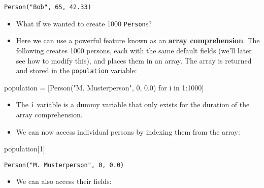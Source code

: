 \documentclass[
  letterpaper,
  DIV=11,
  numbers=noendperiod]{scrartcl}
\newenvironment{Shaded}{\begin{snugshade}}{\end{snugshade}}
\newcommand{\FloatTok}[1]{\textcolor[rgb]{0.68,0.00,0.00}{#1}}
\newcommand{\FunctionTok}[1]{\textcolor[rgb]{0.28,0.35,0.67}{#1}}
\newcommand{\KeywordTok}[1]{\textcolor[rgb]{0.00,0.23,0.31}{#1}}
\newcommand{\NormalTok}[1]{\textcolor[rgb]{0.00,0.23,0.31}{#1}}
\newcommand{\OperatorTok}[1]{\textcolor[rgb]{0.37,0.37,0.37}{#1}}
\newcommand{\StringTok}[1]{\textcolor[rgb]{0.13,0.47,0.30}{#1}}
\providecommand{\tightlist}{%
  \setlength{\itemsep}{0pt}\setlength{\parskip}{0pt}}\usepackage{longtable,booktabs,array}
\begin{document}
\begin{verbatim}
Person("Bob", 65, 42.33)
\end{verbatim}

\begin{itemize}
\tightlist
\item
  What if we wanted to create 1000 \texttt{Person}s?
\end{itemize}

\begin{itemize}
\tightlist
\item
  Here we can use a powerful feature known as an \textbf{array
  comprehension}. The following creates 1000 persons, each with the same
  default fields (we'll later see how to modify this), and places them
  in an array. The array is returned and stored in the
  \texttt{population} variable:
\end{itemize}

\begin{Shaded}
\begin{Highlighting}[]
\NormalTok{population }\OperatorTok{=}\NormalTok{ [}\FunctionTok{Person}\NormalTok{(}\StringTok{"M. Musterperson"}\NormalTok{, }\FloatTok{0}\NormalTok{, }\FloatTok{0.0}\NormalTok{) for i }\KeywordTok{in} \FloatTok{1}\OperatorTok{:}\FloatTok{1000}\NormalTok{]}
\end{Highlighting}
\end{Shaded}

\begin{itemize}
\tightlist
\item
  The \texttt{i} variable is a dummy variable that only exists for the
  duration of the array comprehension.
\end{itemize}

\begin{itemize}
\tightlist
\item
  We can now access individual persons by indexing them from the array:
\end{itemize}

\begin{Shaded}
\begin{Highlighting}[]
\NormalTok{population[}\FloatTok{1}\NormalTok{]}
\end{Highlighting}
\end{Shaded}

\begin{verbatim}
Person("M. Musterperson", 0, 0.0)
\end{verbatim}

\begin{itemize}
\tightlist
\item
  We can also access their fields:
\end{itemize}
\end{document}
